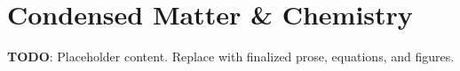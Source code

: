 
\section{Condensed Matter \& Chemistry}
\label{sec:condensed-matter-chemistry}

\textbf{TODO}: Placeholder content. Replace with finalized prose, equations, and figures.

